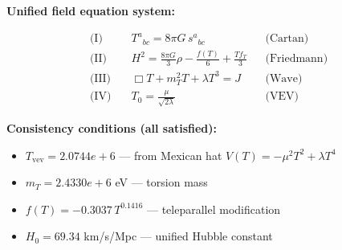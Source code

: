 
\textbf{Unified field equation system:}

\begin{align}
  \text{(I)} \quad & T^a{}_{bc} = 8\pi G \, s^a{}_{bc} && \text{(Cartan)} \\
  \text{(II)} \quad & H^2 = \frac{8\pi G}{3}\rho - \frac{f(T)}{6} + \frac{Tf_T}{3} && \text{(Friedmann)} \\
  \text{(III)} \quad & \Box T + m_T^2 T + \lambda T^3 = J && \text{(Wave)} \\
  \text{(IV)} \quad & T_0 = \frac{\mu}{\sqrt{2\lambda}} && \text{(VEV)}
\end{align}

\textbf{Consistency conditions (all satisfied):}
\begin{itemize}
  \item $T_{\text{vev}} = 2.0744e+6$ — from Mexican hat $V(T) = -\mu^2 T^2 + \lambda T^4$
  \item $m_T = 2.4330e+6$ eV — torsion mass
  \item $f(T) = -0.3037 \, T^{0.1416}$ — teleparallel modification
  \item $H_0 = 69.34$ km/s/Mpc — unified Hubble constant
\end{itemize}